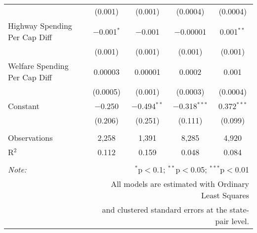 \begin{table}[!htbp]
\begin{tabular}{@{\extracolsep{5pt}}lcccc}
  & (0.001) & (0.001) & (0.0004) & (0.0004) \\ 
  Highway Spending Per Cap Diff & $-$0.001$^{*}$ & $-$0.001 & $-$0.00001 & 0.001$^{**}$ \\ 
  & (0.001) & (0.001) & (0.001) & (0.001) \\ 
  Welfare Spending Per Cap Diff & 0.00003 & 0.00001 & 0.0002 & 0.001 \\ 
  & (0.0005) & (0.001) & (0.0003) & (0.0004) \\ 
  Constant & $-$0.250 & $-$0.494$^{**}$ & $-$0.318$^{***}$ & 0.372$^{***}$ \\ 
  & (0.206) & (0.251) & (0.111) & (0.099) \\ 
 \hline \\[-1.8ex] 
Observations & 2,258 & 1,391 & 8,285 & 4,920 \\ 
R$^{2}$ & 0.112 & 0.159 & 0.048 & 0.084 \\ 
\hline 
\hline \\[-1.8ex] 
\textit{Note:}  & \multicolumn{4}{r}{$^{*}$p$<$0.1; $^{**}$p$<$0.05; $^{***}$p$<$0.01} \\ 
 & \multicolumn{4}{r}{All models are estimated with Ordinary Least Squares} \\ 
 & \multicolumn{4}{r}{and clustered standard errors at the state-pair level.} \\ 
\end{tabular} 
\end{table} 

